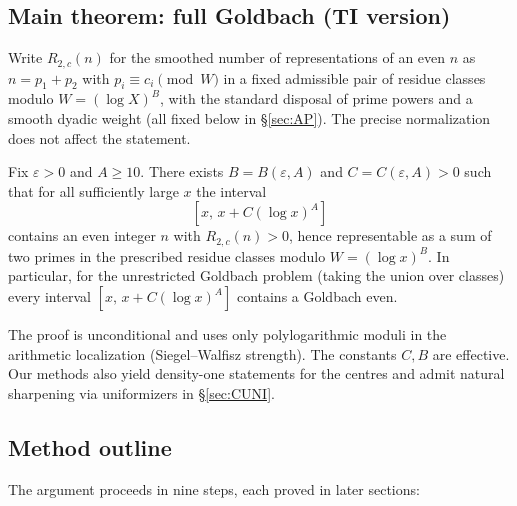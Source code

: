 \subsection{Main theorem: full Goldbach (TI version)}
Write $R_{2,c}(n)$ for the smoothed number of representations of an even $n$ as $n=p_1+p_2$ with $p_i\equiv c_i \pmod W$ in a fixed admissible pair of residue classes modulo $W=(\log X)^B$, with the standard disposal of prime powers and a smooth dyadic weight (all fixed below in \S\ref{sec:AP}). The precise normalization does not affect the statement.

\begin{theorem}\label{thm:long-interval}
Fix $\varepsilon>0$ and $A\ge 10$. There exists $B=B(\varepsilon,A)$ and $C=C(\varepsilon,A)>0$ such that for all sufficiently large $x$ the interval
\[
[x,\,x+C(\log x)^A]
\]
contains an even integer $n$ with $R_{2,c}(n)>0$, hence representable as a sum of two primes in the prescribed residue classes modulo $W=(\log x)^B$. In particular, for the unrestricted Goldbach problem (taking the union over classes) every interval $[x,\,x+C(\log x)^A]$ contains a Goldbach even.
\end{theorem}

\begin{remark}
The proof is unconditional and uses only polylogarithmic moduli in the arithmetic localization (Siegel--Walfisz strength). The constants $C,B$ are effective. Our methods also yield density-one statements for the centres and admit natural sharpening via uniformizers in \S\ref{sec:CUNI}.
\end{remark}

\subsection{Method outline}
The argument proceeds in nine steps, each proved in later sections:

